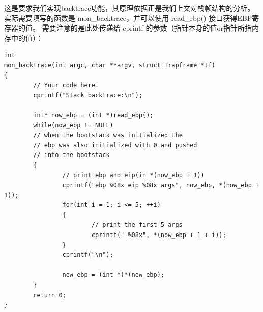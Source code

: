 \documentclass[12pt, letterpaper]{report}
\begin{document}
\quad \par 
这是要求我们实现backtrace功能，其原理依据正是我们上文对栈帧结构的分析。
实际需要填写的函数是 mon\_backtrace，并可以使用 read\_rbp() 接口获得EBP寄存器的值。
需要注意的是此处传递给 cprintf 的参数（指针本身的值or指针所指内存中的值）：\par 
\lstset{style=CStyle}
\setmainfont{Consolas}
\begin{lstlisting}
int
mon_backtrace(int argc, char **argv, struct Trapframe *tf)
{
        // Your code here.
        cprintf("Stack backtrace:\n");

        int* now_ebp = (int *)read_ebp();
        while(now_ebp != NULL)
        // when the bootstack was initialized the 
        // ebp was also initialized with 0 and pushed
        // into the bootstack
        {
                // print ebp and eip(in *(now_ebp + 1))
                cprintf("ebp %08x eip %08x args", now_ebp, *(now_ebp + 1));
                for(int i = 1; i <= 5; ++i)
                {
                        // print the first 5 args
                        cprintf(" %08x", *(now_ebp + 1 + i));
                }
                cprintf("\n");

                now_ebp = (int *)*(now_ebp);
        }
        return 0;
}
\end{lstlisting}
\setmainfont{Times New Roman}
\quad \par 



\end{document}
